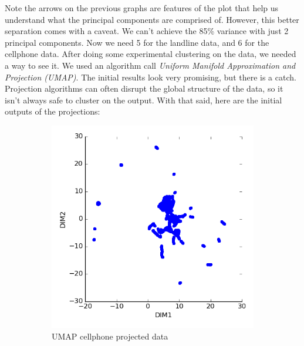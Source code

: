 \documentclass[20pt]{article} %
\begin{document}
\newpage
Note the arrows on the previous graphs are features of the plot that help us understand what the principal components are comprised of.  However, this better separation comes with a caveat.  We can't achieve the 85\% variance with just 2 principal components.  Now we need 5 for the landline data, and 6 for the cellphone data. After doing some experimental clustering on the data, we needed a way to see it.  We used an algorithm call \textit{Uniform Manifold Approximation and Projection (UMAP)}.   The initial results look very promising, but there is a catch.  Projection algorithms can often disrupt the global structure of the data, so it isn't always safe to cluster on the output.  With that said, here are the initial outputs of the projections:

\begin{figure}[!htbp]
  	\centering
   	\begin{subfigure}[p]{0.4\linewidth}
    	\includegraphics[width=\linewidth]{../figures/redo/cellphonemap.png}
	\caption{UMAP cellphone projected data}
   	\end{subfigure}
   	\begin{subfigure}[p]{0.4\linewidth}

\end{subfigure}
\end{figure}
\end{document}
